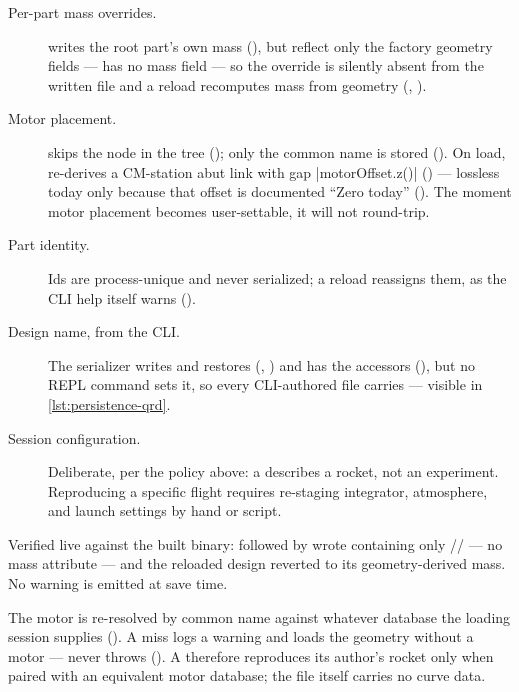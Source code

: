 \begin{description}
\item[Per-part mass overrides.]  writes the root part's own mass
  (), but  reflect only the factory geometry fields ---
   has no mass field --- so the override is silently absent from the written file
  and a reload recomputes mass from geometry (,
  ).
\item[Motor placement.]  skips the  node in the tree
  (); only the common name is stored
  (). On load,  re-derives a CM-station
  abut link with gap \cppinline|motorOffset.z()| () --- lossless
  today only because that offset is documented ``Zero today''
  (). The moment motor placement becomes user-settable, it will not
  round-trip.
\item[Part identity.] Ids are process-unique and never serialized; a reload reassigns them, as the
  CLI help itself warns ().
\item[Design name, from the CLI.] The serializer writes and restores
   (, )
  and  has the accessors (), but no REPL command sets
  it, so every CLI-authored file carries  --- visible in
  \cref{lst:persistence-qrd}.
\item[Session configuration.] Deliberate, per the policy above: a  describes a rocket,
  not an experiment. Reproducing a specific flight requires re-staging integrator, atmosphere, and
  launch settings by hand or script.
\end{description}

\begin{hardfail}
Verified live against the built binary:  followed by  wrote
 containing only // --- no mass
attribute --- and the reloaded design reverted to its geometry-derived mass. No warning is emitted
at save time. \fail
\end{hardfail}

\begin{keyinsight}
The motor is re-resolved by common name against whatever database the loading session supplies
(). A miss logs a warning and loads the geometry without a
motor --- never throws (). A  therefore
reproduces its author's rocket only when paired with an equivalent motor database; the file itself
carries no curve data.
\end{keyinsight}

